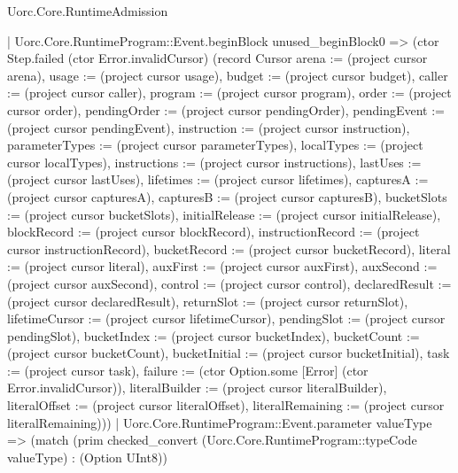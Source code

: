 \begin{lexlean}{Uorc.Core.RuntimeAdmission}
\begin{semanticmodule}
{          | Uorc.Core.RuntimeProgram::Event.beginBlock unused_beginBlock0 => (ctor Step.failed (ctor Error.invalidCursor) (record Cursor {arena := (project cursor arena), usage := (project cursor usage), budget := (project cursor budget), caller := (project cursor caller), program := (project cursor program), order := (project cursor order), pendingOrder := (project cursor pendingOrder), pendingEvent := (project cursor pendingEvent), instruction := (project cursor instruction), parameterTypes := (project cursor parameterTypes), localTypes := (project cursor localTypes), instructions := (project cursor instructions), lastUses := (project cursor lastUses), lifetimes := (project cursor lifetimes), capturesA := (project cursor capturesA), capturesB := (project cursor capturesB), bucketSlots := (project cursor bucketSlots), initialRelease := (project cursor initialRelease), blockRecord := (project cursor blockRecord), instructionRecord := (project cursor instructionRecord), bucketRecord := (project cursor bucketRecord), literal := (project cursor literal), auxFirst := (project cursor auxFirst), auxSecond := (project cursor auxSecond), control := (project cursor control), declaredResult := (project cursor declaredResult), returnSlot := (project cursor returnSlot), lifetimeCursor := (project cursor lifetimeCursor), pendingSlot := (project cursor pendingSlot), bucketIndex := (project cursor bucketIndex), bucketCount := (project cursor bucketCount), bucketInitial := (project cursor bucketInitial), task := (project cursor task), failure := (ctor Option.some [Error] (ctor Error.invalidCursor)), literalBuilder := (project cursor literalBuilder), literalOffset := (project cursor literalOffset), literalRemaining := (project cursor literalRemaining)}))
          | Uorc.Core.RuntimeProgram::Event.parameter valueType => (match (prim checked_convert (Uorc.Core.RuntimeProgram::typeCode valueType) : (Option UInt8))
}
\end{semanticmodule}
\end{lexlean}
